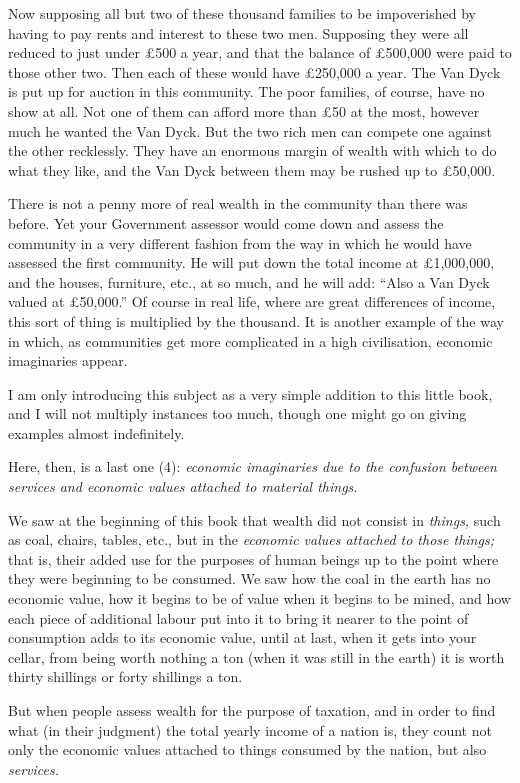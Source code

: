 \documentclass{book}
\begin{document}
Now supposing all but two of these thousand families to be impoverished by having to pay rents and interest to these two men. Supposing they were all reduced to just under £500 a year, and that the balance of £500,000 were paid to those other two. Then each of these would have £250,000 a year. The Van Dyck is put up for auction in this community. The poor families, of course, have no show at all. Not one of them can afford more than £50 at the most, however much he wanted the Van Dyck. But the two rich men can compete one against the other recklessly. They have an enormous margin of wealth with which to do what they like, and the Van Dyck between them may be rushed up to £50,000.

There is not a penny more of real wealth in the community than there was before. Yet your Government assessor would come down and assess the community in a very different fashion from the way in which he would have assessed the first community. He will put down the total income at £1,000,000, and the houses, furniture, etc., at so much, and he will add: “Also a Van Dyck valued at £50,000.” Of course in real life, where are great differences of income, this sort of thing is multiplied by the thousand. It is another example of the way in which, as communities get more complicated in a high civilisation, economic imaginaries appear.

I am only introducing this subject as a very simple addition to this little book, and I will not multiply instances too much, though one might go on giving examples almost indefinitely.

Here, then, is a last one (4): \emph{economic imaginaries due to the confusion between services and economic values attached to material things.}

We saw at the beginning of this book that wealth did not consist in \emph{things,} such as coal, chairs, tables, etc., but in the \emph{economic values attached to those things;} that is, their added use for the purposes of human beings up to the point where they were beginning to be consumed. We saw how the coal in the earth has no economic value, how it begins to be of value when it begins to be mined, and how each piece of additional labour put into it to bring it nearer to the point of consumption adds to its economic value, until at last, when it gets into your cellar, from being worth nothing a ton (when it was still in the earth) it is worth thirty shillings or forty shillings a ton.

But when people assess wealth for the purpose of taxation, and in order to find what (in their judgment) the total yearly income of a nation is, they count not only the economic values attached to things consumed by the nation, but also \emph{services.}
\end{document}
